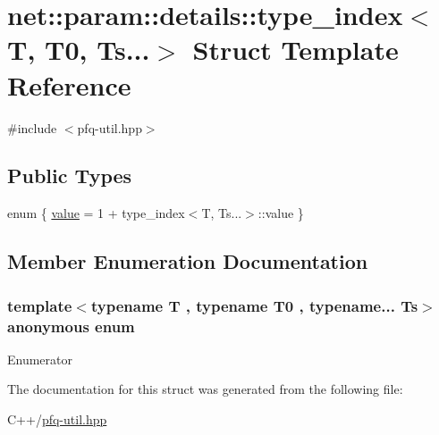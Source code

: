 \hypertarget{structnet_1_1param_1_1details_1_1type__index_3_01T_00_01T0_00_01Ts_8_8_8_4}{\section{net\+:\+:param\+:\+:details\+:\+:type\+\_\+index$<$ T, T0, Ts...$>$ Struct Template Reference}
\label{structnet_1_1param_1_1details_1_1type__index_3_01T_00_01T0_00_01Ts_8_8_8_4}
}


{\ttfamily \#include $<$pfq-\/util.\+hpp$>$}

\subsection*{Public Types}
\begin{DoxyCompactItemize}
\item 
enum \{ \hyperlink{structnet_1_1param_1_1details_1_1type__index_3_01T_00_01T0_00_01Ts_8_8_8_4_a0e1958d65adb96b5b73afd41372b1a8fac571d4fccf6873682c31e1fa9dd70e56}{value} = 1 + type\+\_\+index$<$T, Ts...$>$\+:\+:value
 \}
\end{DoxyCompactItemize}


\subsection{Member Enumeration Documentation}
\hypertarget{structnet_1_1param_1_1details_1_1type__index_3_01T_00_01T0_00_01Ts_8_8_8_4_a0e1958d65adb96b5b73afd41372b1a8f}{\subsubsection[{anonymous enum}]{\setlength{\rightskip}{0pt plus 5cm}template$<$typename T , typename T0 , typename... Ts$>$ anonymous enum}}\label{structnet_1_1param_1_1details_1_1type__index_3_01T_00_01T0_00_01Ts_8_8_8_4_a0e1958d65adb96b5b73afd41372b1a8f}
\begin{Desc}
\item[Enumerator]\par
\begin{description}
\item[{\em 
\hypertarget{structnet_1_1param_1_1details_1_1type__index_3_01T_00_01T0_00_01Ts_8_8_8_4_a0e1958d65adb96b5b73afd41372b1a8fac571d4fccf6873682c31e1fa9dd70e56}{value}\label{structnet_1_1param_1_1details_1_1type__index_3_01T_00_01T0_00_01Ts_8_8_8_4_a0e1958d65adb96b5b73afd41372b1a8fac571d4fccf6873682c31e1fa9dd70e56}
}]\end{description}
\end{Desc}


The documentation for this struct was generated from the following file\+:\begin{DoxyCompactItemize}
\item 
C++/\hyperlink{pfq-util_8hpp}{pfq-\/util.\+hpp}\end{DoxyCompactItemize}

